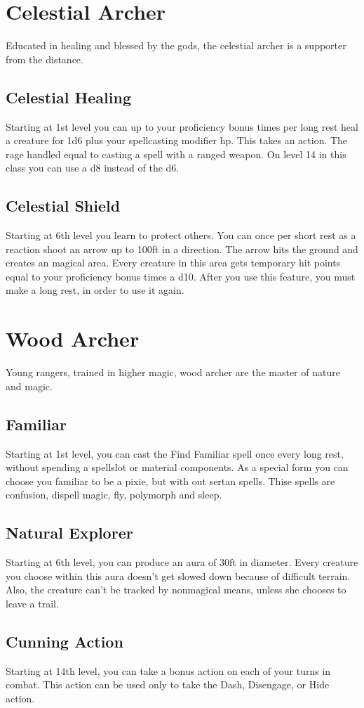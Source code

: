 \documentclass[a4paper,10pt,twoside,twocolumn, bg=print]{dndbook} %
\begin{document}
	\section{Celestial Archer}
		Educated in healing and blessed by the gods, the celestial archer is a supporter from the distance.
		\subsection{Celestial Healing}
			Starting at 1st level you can up to your proficiency bonus times per long rest heal a creature for 1d6 plus your spellcasting modifier hp. This takes an action. The rage handled equal to casting a spell with a ranged weapon. On level 14 in this class you can use a d8 instead of the d6.
		\subsection{Celestial Shield}
			Starting at 6th level you learn to protect others. You can once per short rest as a reaction shoot an arrow up to 100ft in a direction. The arrow hits the ground and creates an magical area. Every creature in this area gets temporary hit points equal to your proficiency bonus times a d10. After you use this feature, you must make a long rest, in order to use it again.
	\section{Wood Archer}
		Young rangers, trained in higher magic, wood archer are the master of nature and magic.
		\subsection{Familiar}
			Starting at 1st level, you can cast the Find Familiar spell once every long rest, without spending a spellslot or material components. As a special form you can choose you familiar to be a pixie, but with out sertan spells. Thise spells are confusion, dispell magic, fly, polymorph and sleep.
		\subsection{Natural Explorer}
			Starting at 6th level, you can produce an aura of 30ft in diameter. Every creature you choose within this aura doesn't get slowed down because of difficult terrain. Also, the creature can't be tracked by nonmagical means, unless she chooses to leave a trail.
		\subsection{Cunning Action}
			Starting at 14th level, you can take a bonus action on each of your turns in combat. This action can be used only to take the Dash, Disengage, or Hide action.
\end{document}
